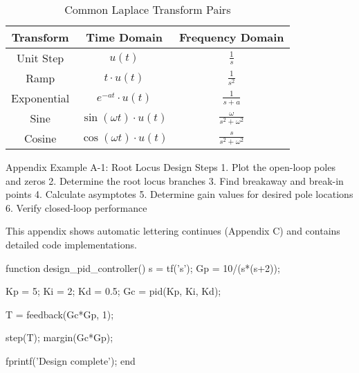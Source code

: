 \documentclass{homework}
\begin{document}
\begin{table}[h]
\centering
\begin{tabular}{|c|c|c|}
\hline
\textbf{Transform} & \textbf{Time Domain} & \textbf{Frequency Domain} \\
\hline
Unit Step & $u(t)$ & $\frac{1}{s}$ \\
Ramp & $t \cdot u(t)$ & $\frac{1}{s^2}$ \\
Exponential & $e^{-at} \cdot u(t)$ & $\frac{1}{s+a}$ \\
Sine & $\sin(\omega t) \cdot u(t)$ & $\frac{\omega}{s^2 + \omega^2}$ \\
Cosine & $\cos(\omega t) \cdot u(t)$ & $\frac{s}{s^2 + \omega^2}$ \\
\hline
\end{tabular}
\caption{Common Laplace Transform Pairs}
\end{table}

\begin{example}{Appendix Example A-1: Root Locus Design Steps}
1. Plot the open-loop poles and zeros
2. Determine the root locus branches
3. Find breakaway and break-in points
4. Calculate asymptotes
5. Determine gain values for desired pole locations
6. Verify closed-loop performance
\end{example}

This appendix shows automatic lettering continues (Appendix C) and contains detailed code implementations.

\begin{hwmatlab}
function design_pid_controller()
    s = tf('s');
    Gp = 10/(s*(s+2));
    
    Kp = 5; Ki = 2; Kd = 0.5;
    Gc = pid(Kp, Ki, Kd);
    
    T = feedback(Gc*Gp, 1);
    
    step(T);
    margin(Gc*Gp);
    
    fprintf('Design complete\n');
end
\end{hwmatlab}

\end{document}
